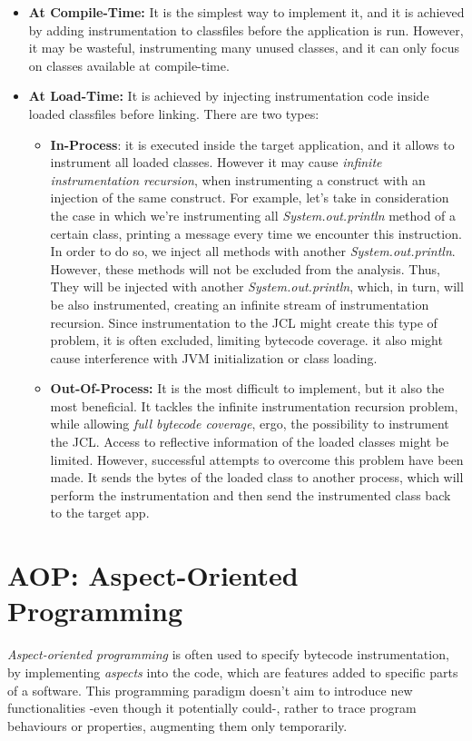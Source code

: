 \documentclass[]{usiinfthesis}
\begin{document}
\begin{itemize}
    \item \textbf{At Compile-Time:} It is the simplest way to implement it, and it is achieved by adding instrumentation to classfiles before the application is run. However, it may be wasteful, instrumenting many unused classes, and it can only focus on classes available at compile-time.
    \item \textbf{At Load-Time:} It is achieved by injecting instrumentation code inside loaded classfiles before linking. There are two types:
    \begin{itemize}
        \item \textbf{In-Process}: it is executed inside the target application, and it allows to instrument all loaded classes. However it may cause \textit{infinite instrumentation recursion}, when instrumenting a construct with an injection of the same construct. For example, let's take in consideration the case in which we're instrumenting all \textit{System.out.println} method of a certain class, printing a message every time we encounter this instruction. In order to do so, we inject all methods with another \textit{System.out.println}. However, these methods will not be excluded from the analysis. Thus, They will be injected with another \textit{System.out.println}, which, in turn, will be also instrumented, creating an infinite stream of instrumentation recursion. Since instrumentation to the JCL might create this type of problem, it is often excluded, limiting bytecode coverage. it also might cause interference with JVM initialization or class loading.
        \item \textbf{Out-Of-Process:} It is the most difficult to implement, but it also the most beneficial. It tackles the infinite instrumentation recursion problem, while allowing \textit{full bytecode coverage}, ergo, the possibility to instrument the JCL. Access to reflective information of the loaded classes might be limited. However, successful attempts to overcome this problem have been made. It sends the bytes of the loaded class to another process, which will perform the instrumentation and then send the instrumented class back to the target app.
    \end{itemize}
\end{itemize}


\section{AOP: Aspect-Oriented Programming} \label{sec:2.2}
\textit{Aspect-oriented programming} is often used to specify bytecode instrumentation, by implementing \textit{aspects} into the code, which are features added to specific parts of a software. This programming paradigm doesn't aim to introduce new functionalities -even though it potentially could-, rather to trace program behaviours or properties, augmenting them only temporarily.
\end{document}
